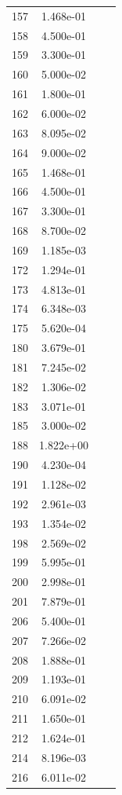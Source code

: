 \documentclass[12pt]{article}
\begin{document}
\begin{longtable}{@{}cccc@{}}
157 & 1.468e-01 &  &  \\
158 & 4.500e-01 &  &  \\
159 & 3.300e-01 &  &  \\
160 & 5.000e-02 &  &  \\
161 & 1.800e-01 &  &  \\
162 & 6.000e-02 &  &  \\
163 & 8.095e-02 &  &  \\
164 & 9.000e-02 &  &  \\
165 & 1.468e-01 &  &  \\
166 & 4.500e-01 &  &  \\
167 & 3.300e-01 &  &  \\
168 & 8.700e-02 &  &  \\
169 & 1.185e-03 &  &  \\
172 & 1.294e-01 &  &  \\
173 & 4.813e-01 &  &  \\
174 & 6.348e-03 &  &  \\
175 & 5.620e-04 &  &  \\
180 & 3.679e-01 &  &  \\
181 & 7.245e-02 &  &  \\
182 & 1.306e-02 &  &  \\
183 & 3.071e-01 &  &  \\
185 & 3.000e-02 &  &  \\
188 & 1.822e+00 &  &  \\
190 & 4.230e-04 &  &  \\
191 & 1.128e-02 &  &  \\
192 & 2.961e-03 &  &  \\
193 & 1.354e-02 &  &  \\
198 & 2.569e-02 &  &  \\
199 & 5.995e-01 &  &  \\
200 & 2.998e-01 &  &  \\
201 & 7.879e-01 &  &  \\
206 & 5.400e-01 &  &  \\
207 & 7.266e-02 &  &  \\
208 & 1.888e-01 &  &  \\
209 & 1.193e-01 &  &  \\
210 & 6.091e-02 &  &  \\
211 & 1.650e-01 &  &  \\
212 & 1.624e-01 &  &  \\
214 & 8.196e-03 &  &  \\
216 & 6.011e-02 &  &  \\

\end{longtable}
\end{document}
